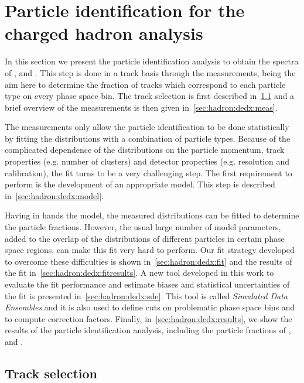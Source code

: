 \section{\boldmath Particle identification for the charged hadron analysis}
\label{sec:hadron:dedx}

In this section we present the particle identification
analysis to obtain the spectra of \pions, \kaons and \protonpm.
This step is done in a track basis through the \dedx measurements,
being the aim here to determine the fraction of tracks which
correspond to each particle type on every phase space bin.
The track selection is first described in~\cref{sec:hadron:dedx:selection}
and a brief overview of the \dedx measurements is then given
in~\cref{sec:hadron:dedx:meas}.

The \dedx measurements only allow the particle identification
to be done statistically by fitting
the \dedx distributions with a combination of particle
types. Because of the complicated dependence of the \dedx
distributions on the particle momentum,
track properties (e.g. number of clusters) and
detector properties (e.g. resolution and calibration),
the \dedx fit turns to be a very challenging step.
The first requirement to perform is the development
of an appropriate \dedx model. This step is described in~\cref{sec:hadron:dedx:model}.

Having in hands the \dedx model, the measured \dedx
distributions can be fitted to determine the particle
fractions. However, the usual large number of
model parameters, added to the
overlap of the \dedx distributions
of different particles in certain phase space regions,
can make this fit very hard to perform.
Our fit strategy developed to overcome these difficulties is shown
in~\cref{sec:hadron:dedx:fit} and the results
of the fit in~\cref{sec:hadron:dedx:fitresults}. A new tool
developed in this work to evaluate the fit performance
and estimate biases and statistical uncertainties of the fit
is presented in~\cref{sec:hadron:dedx:sde}. This
tool is called \emph{Simulated Data Ensembles} and
it is also used to define cuts on problematic
phase space bins and to compute correction factors.
Finally, in~\cref{sec:hadron:dedx:results}, we show the results
of the particle identification analysis, including
the particle fractions of \pions, \kaons and \protonpm.


\subsection{\boldmath \boldmath Track selection}
\label{sec:hadron:dedx:selection}

